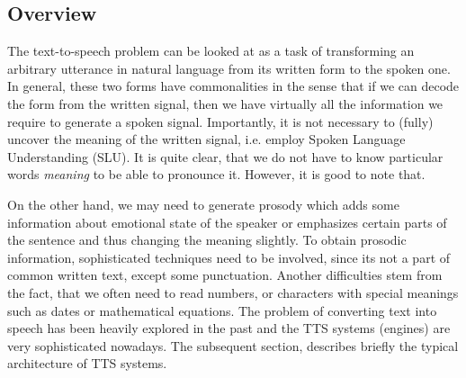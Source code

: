 \subsection*{Overview}
\cite{taylor2009text}
The text-to-speech problem can be looked at as a task of transforming an arbitrary utterance in natural language from its written form to the spoken one.
In general, these two forms have commonalities in the sense that if we can decode the form from the written signal, then we have virtually all the information we require to generate a spoken signal.
Importantly, it is not necessary to (fully) uncover the meaning of the written signal, i.e. employ Spoken Language Understanding (SLU).
It is quite clear, that we do not have to know particular words \textit{meaning} to be able to pronounce it.
However, it is good to note that.
\par
On the other hand, we may need to generate prosody which adds some information about emotional state of the speaker or emphasizes certain parts of the sentence and thus changing the meaning slightly.
To obtain prosodic information, sophisticated techniques need to be involved, since its not a part of common written text, except some punctuation.
Another difficulties stem from the fact, that we often need to read numbers, or characters with special meanings such as dates or mathematical equations.
The problem of converting text into speech has been heavily explored in the past and the TTS systems (engines) are very sophisticated nowadays.
The subsequent section, describes briefly the typical architecture of TTS systems.

